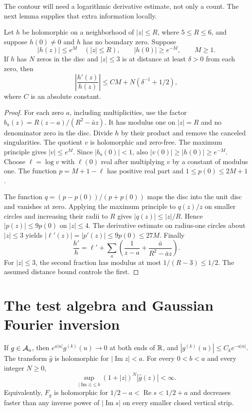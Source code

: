 The contour will need a logarithmic derivative estimate, not only a count.
The next lemma supplies that extra information locally.

\begin{lemma}
\label{lem:local-log}
Let $h$ be holomorphic on a neighborhood of $|z|\leq R$, where
$5\leq R\leq6$, and suppose $h(0)\ne0$ and $h$ has no boundary zero.
Suppose
\[
 |h(z)|\leq e^M\quad(|z|\leq R),\qquad |h(0)|\geq e^{-M},\qquad M\geq1.
\]
If $h$ has $N$ zeros in the disc and $|z|\leq3$ is at distance at least
$\delta>0$ from each zero, then
\[
 \left|\frac{h'(z)}{h(z)}\right|
 \leq C M+N(\delta^{-1}+1/2),
\]
where $C$ is an absolute constant.
\end{lemma}

\begin{proof}
For each zero $a$, including multiplicities, use the factor
$b_a(z)=R(z-a)/(R^2-\bar a z)$.
It has modulus one on $|z|=R$ and no denominator zero in the disc.
Divide $h$ by their product and remove the canceled singularities.
The quotient $v$ is holomorphic and zero-free.
The maximum principle gives $|v|\leq e^M$.
Since $|b_a(0)|<1$, also $|v(0)|\geq|h(0)|\geq e^{-M}$.
Choose $\ell=\log v$ with $\ell(0)$ real after multiplying $v$ by a constant
of modulus one.  The function $p=M+1-\ell$ has positive real part and
$1\leq p(0)\leq2M+1$.

The function $q=(p-p(0))/(p+p(0))$ maps the disc into the unit disc and
vanishes at zero.  Applying the maximum principle to $q(z)/z$ on smaller
circles and increasing their radii to $R$ gives $|q(z)|\leq|z|/R$.
Hence $|p(z)|\leq9p(0)$ on $|z|\leq4$.
The derivative estimate on radius-one circles about $|z|\leq3$ yields
$|\ell'(z)|=|p'(z)|\leq9p(0)\leq27M$.
Finally
\[
 \frac{h'}h=\ell'+\sum_a
 \left(\frac1{z-a}+\frac{\bar a}{R^2-\bar a z}\right).
\]
For $|z|\leq3$, the second fraction has modulus at most $1/(R-3)\leq1/2$.
The assumed distance bound controls the first.
\end{proof}

\section{The test algebra and Gaussian Fourier inversion}
\label{sec:tests}

\begin{lemma}
\label{lem:test-bounds}
If $g\in\mathcal A_a$, then $e^{a|u|}g^{(k)}(u)\to0$ at both ends of $\mathbb R$,
and $|g^{(k)}(u)|\leq C_k e^{-a|u|}$.
The transform $\widehat g$ is holomorphic for $|\operatorname{Im}z|<a$.
For every $0<b<a$ and every integer $N\geq0$,
\begin{equation}
 \sup_{|\operatorname{Im}z|\leq b}(1+|z|)^N|\widehat g(z)|<\infty.
 \label{eq:strip-decay}
\end{equation}
Equivalently, $F_g$ is holomorphic for $1/2-a<\operatorname{Re}s<1/2+a$
and decreases faster than any inverse power of $|\operatorname{Im}s|$
on every smaller closed vertical strip.
\end{lemma}

